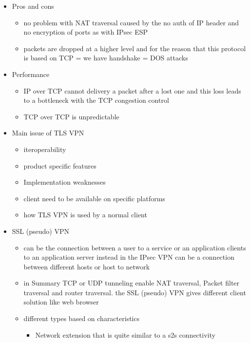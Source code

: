 \documentclass{article}
\begin{document}
\begin{itemize}
\begin{itemize}
\begin{itemize}
        \end{itemize}
    \end{itemize}
    \item Pros and cons
    \begin{itemize}
        \item no problem with NAT traversal caused by the no auth of IP header and no encryption of ports as with IPsec ESP 
        \item packets are dropped at a higher level and for the reason that this protocol is based on TCP = we have handshake = DOS attacks
    \end{itemize}
    \item Performance
    \begin{itemize}
        \item IP over TCP cannot delivery a packet after a lost one and this loss leads to a bottleneck with the TCP congestion control
        \item TCP over TCP is unpredictable
    \end{itemize}
    \item Main issue of TLS VPN
    \begin{itemize}
        \item iteroperability
        \item product specific features
        \item Implementation weaknesses
        \item client need to be available on specific platforms 
        \item how TLS VPN is used by a normal client
    \end{itemize}
    \item SSL (pseudo) VPN
    \begin{itemize}
        \item can be the connection between a user to a service or an application clients to an application server instead in the IPsec VPN can be a connection between different hosts or host to network
        \item in Summary TCP or UDP tunneling enable NAT traversal, Packet filter traversal and router traversal. the SSL (pseudo) VPN gives different client solution like web browser
        \item different types based on characteristics
        \begin{itemize}
            \item Network extension that is quite similar to a s2s connectivity
            \begin{itemize}

\end{itemize}
\end{itemize}
\end{itemize}
\end{itemize}
\end{document}
